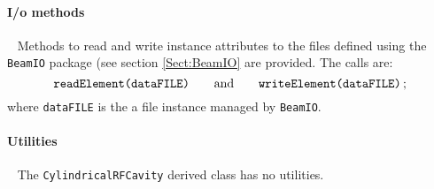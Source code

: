\paragraph{I/o methods} ~\newline
\noindent
Methods to read and write instance attributes to the files defined
using the \texttt{BeamIO} package (see section \ref{Sect:BeamIO} are
provided.
The calls are:
\begin{equation}
  \texttt{readElement(dataFILE)} \quad \quad {\rm and }
      \quad \quad \texttt{writeElement(dataFILE)} \,; \nonumber
\end{equation}
where \texttt{dataFILE} is the a file instance managed by \texttt{BeamIO}.

\paragraph{Utilities} ~\newline
\noindent
The \texttt{CylindricalRFCavity} derived class has no utilities.
